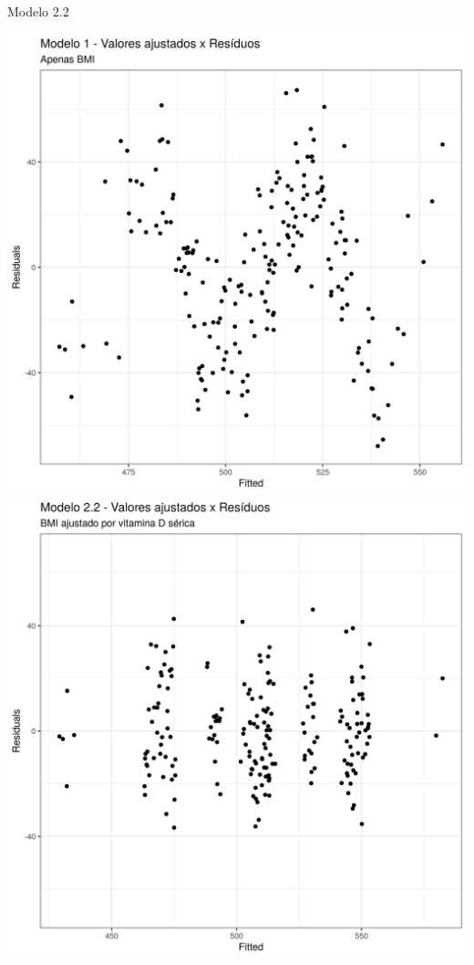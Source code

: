 \documentclass{beamer}
\begin{document}
\begin{frame}{\scriptsize Modelo 2.2}
  \begin{center}
    \includegraphics[height=.6\textheight]{Cap31-32/pratica-rlm1-resid}
    \includegraphics[height=.6\textheight]{Cap31-32/pratica-rlm2_2-resid}
  \end{center}
\end{frame}
\end{document}
